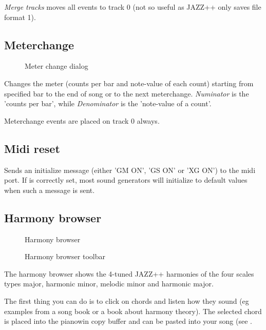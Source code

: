 \documentclass[letterpaper]{report}
\begin{document}
{\em Merge tracks} moves all events to track 0 (not so useful as JAZZ++ only
saves file format 1).

\subsection{Meterchange}\label{meterchange}

\begin{figure}%
%
%
\caption{Meter change dialog}%
\end{figure}

Changes the meter (counts per bar and note-value of each count) starting
from specified bar to the end of song or to the
next meterchange. {\em Numinator} is the 'counts per bar', while
{\em Denominator} is the 'note-value of a count'.

Meterchange events are placed on track 0 always.

\subsection{Midi reset}\label{panic}

Sends an initialize message (either 'GM ON', 'GS ON' or 'XG ON') to the midi
port. If  is correctly set, most sound
generators will initialize to default values when such a message is
sent.

\subsection{Harmony browser}\label{hbrowser}

\begin{figure}%
%
%
\caption{Harmony browser}%
\end{figure}

\begin{figure}%
%
%
\caption{Harmony browser toolbar}%
\end{figure}

The harmony browser shows the 4-tuned JAZZ++ harmonies of the four scales
types major, harmonic minor, melodic minor and harmonic major.

The first thing you can do is to click on chords and listen how they sound (eg
examples from a song book or a book about harmony theory). The selected
chord is placed into the pianowin copy buffer and can be pasted into
your song (see .
\end{document}
